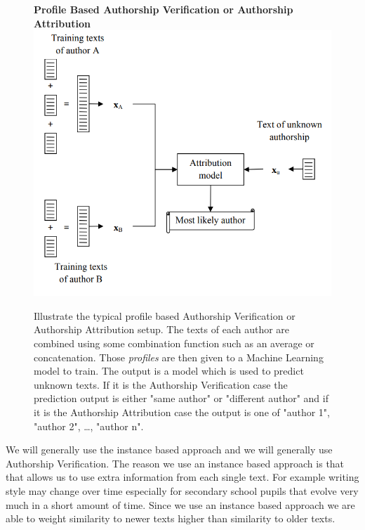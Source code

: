 \begin{figure}[htb]
    \centering
    \textbf{Profile Based Authorship Verification or Authorship Attribution}
    \includegraphics[scale=0.4]{./pictures/method/profile_based.png}
    \caption{Illustrate the typical profile based Authorship Verification or
        Authorship Attribution setup.\cite{stamatos2009} The texts of each
        author are combined using some combination function such as an average
        or concatenation. Those \textit{profiles} are then given to a Machine
        Learning model to train. The output is a model which is used to predict
        unknown texts. If it is the Authorship Verification case the prediction
        output is either "same author" or "different author" and if it is the
        Authorship Attribution case the output is one of "author 1", "author 2",
        \dots, "author n".}
    \label{fig:profile_based}
\end{figure}

We will generally use the instance based approach and we will generally use
Authorship Verification. The reason we use an instance based approach is that
that allows us to use extra information from each single text. For example
writing style may change over time especially for secondary school pupils that
evolve very much in a short amount of time. Since we use an instance based
approach we are able to weight similarity to newer texts higher than similarity
to older texts.

